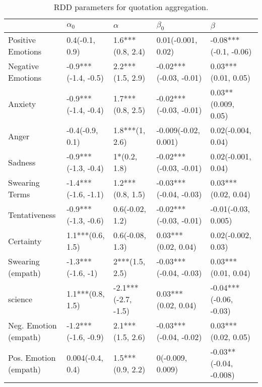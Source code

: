\begin{table}[h]\centering
\begin{adjustbox}{width=\linewidth, center}
	\begin{tabular}{lllll}
	\toprule
	{} &           $\alpha_0$ &             $\alpha$ &               $\beta_0$ &                 $\beta$ \\
	\midrule
	Positive Emotions     &       0.4(-0.1, 0.9) &     1.6***(0.8, 2.4) &      0.01(-0.001, 0.02) &   -0.08***(-0.1, -0.06) \\
	Negative Emotions     &  -0.9***(-1.4, -0.5) &     2.2***(1.5, 2.9) &  -0.02***(-0.03, -0.01) &     0.03***(0.01, 0.05) \\
	Anxiety               &  -0.9***(-1.4, -0.4) &     1.7***(0.8, 2.5) &  -0.02***(-0.03, -0.01) &     0.03**(0.009, 0.05) \\
	Anger                 &      -0.4(-0.9, 0.1) &       1.8***(1, 2.6) &    -0.009(-0.02, 0.001) &      0.02(-0.004, 0.04) \\
	Sadness               &  -0.9***(-1.3, -0.4) &         1*(0.2, 1.8) &  -0.02***(-0.03, -0.01) &      0.02(-0.001, 0.04) \\
	Swearing Terms        &  -1.4***(-1.6, -1.1) &     1.2***(0.8, 1.5) &  -0.03***(-0.04, -0.03) &     0.03***(0.02, 0.04) \\
	Tentativeness         &  -0.9***(-1.3, -0.6) &      0.6(-0.02, 1.2) &  -0.02***(-0.03, -0.01) &     -0.01(-0.03, 0.005) \\
	Certainty             &     1.1***(0.6, 1.5) &      0.6(-0.08, 1.3) &     0.03***(0.02, 0.04) &      0.02(-0.002, 0.03) \\
	Swearing (empath)     &    -1.3***(-1.6, -1) &       2***(1.5, 2.5) &  -0.03***(-0.04, -0.03) &     0.03***(0.01, 0.04) \\
	science               &     1.1***(0.8, 1.5) &  -2.1***(-2.7, -1.5) &     0.03***(0.02, 0.04) &  -0.04***(-0.06, -0.03) \\
	Neg. Emotion (empath) &  -1.2***(-1.6, -0.9) &     2.1***(1.5, 2.6) &  -0.03***(-0.04, -0.02) &     0.03***(0.02, 0.05) \\
	Pos. Emotion (empath) &     0.004(-0.4, 0.4) &     1.5***(0.9, 2.2) &        0(-0.009, 0.009) &  -0.03**(-0.04, -0.008) \\
	\bottomrule
	\end{tabular}
	
\end{adjustbox}
	\caption{RDD parameters for quotation aggregation.}
	\label{fig: Quotation_1}
\end{table}

